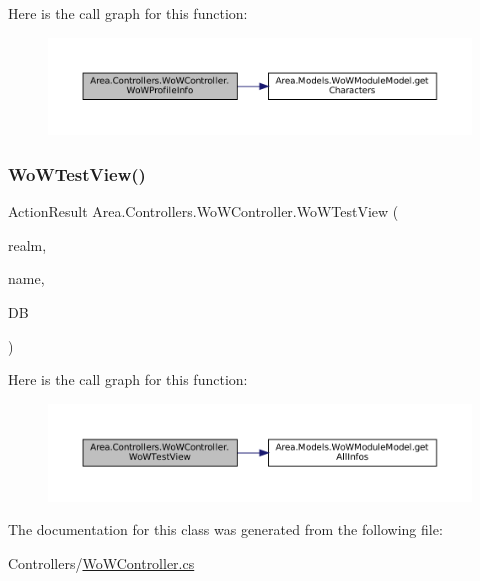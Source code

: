 Here is the call graph for this function\+:
\nopagebreak
\begin{figure}[H]
\begin{center}
\leavevmode
\includegraphics[width=350pt]{classArea_1_1Controllers_1_1WoWController_af7c8c765c5977d7f72fc4a6a31db85ce_cgraph}
\end{center}
\end{figure}
\mbox{\label{classArea_1_1Controllers_1_1WoWController_a17e036e37a19590d448970b39a6f1282}} 
\subsubsection{\texorpdfstring{Wo\+W\+Test\+View()}{WoWTestView()}}
{\footnotesize\ttfamily Action\+Result Area.\+Controllers.\+Wo\+W\+Controller.\+Wo\+W\+Test\+View (\begin{DoxyParamCaption}\item[{string}]{realm,  }\item[{string}]{name,  }\item[{\mbox{[}\+From\+Services\mbox{]} \mbox{\hyperlink{classArea_1_1DAT_1_1AreaDbContext}{Area\+Db\+Context}}}]{DB }\end{DoxyParamCaption})\hspace{0.3cm}{\ttfamily [inline]}}

Here is the call graph for this function\+:
\nopagebreak
\begin{figure}[H]
\begin{center}
\leavevmode
\includegraphics[width=350pt]{classArea_1_1Controllers_1_1WoWController_a17e036e37a19590d448970b39a6f1282_cgraph}
\end{center}
\end{figure}


The documentation for this class was generated from the following file\+:\begin{DoxyCompactItemize}
\item 
Controllers/\mbox{\hyperlink{WoWController_8cs}{Wo\+W\+Controller.\+cs}}\end{DoxyCompactItemize}
